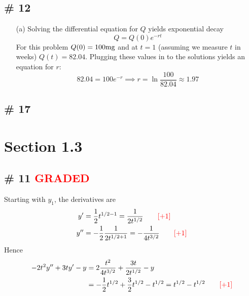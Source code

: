 \documentclass[12pt,letterpaper]{exam}
\newcommand{\grade}{\textcolor{red}{GRADED}}
\newcommand{\pts}[1]{\textcolor{red}{[#1]}}
\begin{document}
\subsection*{\# 12}
\begin{enumerate}
\item[(a)] Solving the differential equation for $Q$ yields exponential decay
\begin{equation}
Q = Q(0)e^{-rt}
\end{equation}
For this problem $Q(0) = 100{\rm mg}$ and at $t=1$ (assuming we measure $t$ in weeks) $Q(t) = 82.04$. Plugging these values in to the solutions yields an equation for $r$: 
\begin{equation*}
82.04 = 100 e^{-r} \implies r =  \ln \frac{100}{82.04} \approx 1.97
\end{equation*}
\end{enumerate}


\subsection*{\# 17}


\newpage
\section*{Section 1.3}

\subsection*{\# 11 \grade}
Starting with $y_1$, the derivatives are
\begin{align}
y' &= \frac{1}{2}t^{1/2-1} = \frac{1}{2t^{1/2}} \quad\quad \text{\pts{+1}}\\
y'' &= -\frac{1}{2} \frac{1}{2t^{1/2+1}} = -\frac{1}{4t^{3/2}} \quad\quad \text{\pts{+1}}
\end{align}
Hence 
\begin{align}
-2t^2y'' + 3ty' - y &= 2\frac{t^2}{4t^{3/2}}  +\frac{3t}{2t^{1/2}} - y\\
&= -\frac{1}{2}t^{1/2} + \frac{3}{2}t^{1/2} - t^{1/2} = t^{1/2} - t^{1/2} \quad\quad \text{\pts{+1}}
\end{align}
\end{document}
